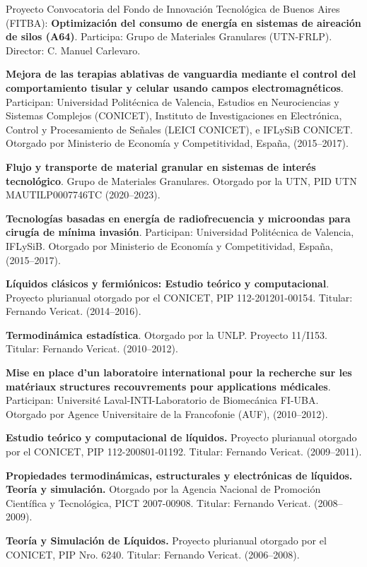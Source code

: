 \documentclass[margin,line]{res}
\begin{document}
\begin{resume}
Proyecto Convocatoria del Fondo de Innovación Tecnológica de Buenos Aires (FITBA): \textbf{Optimización del consumo de energía en sistemas de aireación de silos (A64)}. Participa: Grupo de Materiales Granulares (UTN-FRLP). Director: C. Manuel Carlevaro.


\textbf{Mejora de las terapias ablativas de vanguardia mediante el control del comportamiento tisular y celular usando campos electromagnéticos}. Participan: Universidad Politécnica de Valencia, Estudios en Neurociencias y Sistemas Complejos (CONICET), Instituto de Investigaciones en Electrónica, Control y Procesamiento de Señales (LEICI CONICET), e IFLySiB CONICET. Otorgado por Ministerio de Economía y Competitividad, España, (2015--2017).

\textbf{Flujo y transporte de material granular en sistemas de interés tecnológico}. Grupo de Materiales Granulares. Otorgado por la UTN, PID UTN MAUTILP0007746TC (2020--2023).

\textbf{Tecnologías basadas en energía de radiofrecuencia y microondas para cirugía de mínima invasión}. Participan: Universidad Politécnica de Valencia, IFLySiB. Otorgado por Ministerio de Economía y Competitividad, España, (2015--2017).

\textbf{Líquidos clásicos y fermiónicos: Estudio teórico y computacional}. Proyecto plurianual otorgado por el CONICET, PIP 112-201201-00154. Titular: Fernando Vericat. (2014--2016).

\textbf{Termodinámica estadística}. Otorgado por la UNLP. Proyecto 11/I153. Titular: Fernando Vericat. (2010--2012).

\textbf{Mise en place d’un laboratoire international pour la recherche sur les matériaux structures recouvrements pour applications médicales}. Participan: Université Laval-INTI-Laboratorio de Biomecánica FI-UBA. Otorgado por Agence Universitaire de la Francofonie (AUF), (2010--2012).

\textbf{Estudio teórico y computacional de líquidos.} Proyecto plurianual otorgado por el CONICET, PIP  112-200801-01192. Titular: Fernando Vericat. (2009--2011).

\textbf{Propiedades termodinámicas, estructurales y electrónicas de líquidos. Teoría y simulación.} Otorgado por la Agencia Nacional de Promoción Científica y Tecnológica, PICT 2007-00908. Titular: Fernando Vericat. (2008--2009).

\textbf{Teoría y Simulación de Líquidos.} Proyecto plurianual otorgado por el CONICET, PIP Nro. 6240. Titular: Fernando Vericat. (2006--2008).


\end{resume}
\end{document}
